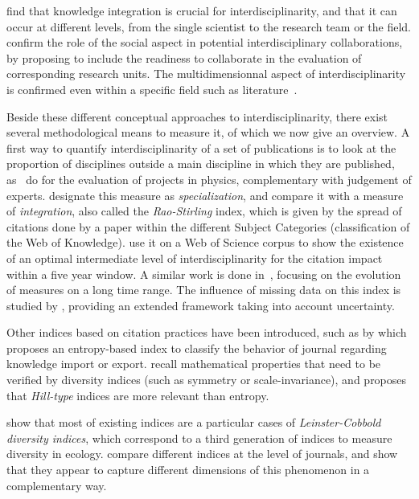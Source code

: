 \documentclass[10pt]{article}
\begin{document}
\cite{wagner2011approaches} find that knowledge integration is crucial for interdisciplinarity, and that it can occur at different levels, from the single scientist to the research team or the field. \cite{hall2008collaboration} confirm the role of the social aspect in potential interdisciplinary collaborations, by proposing to include the readiness to collaborate in the evaluation of corresponding research units. The multidimensionnal aspect of interdisciplinarity is confirmed even within a specific field such as literature~\citep{austin1996defining}.

Beside these different conceptual approaches to interdisciplinarity, there exist several methodological means to measure it, of which we now give an overview. A first way to quantify interdisciplinarity of a set of publications is to look at the proportion of disciplines outside a main discipline in which they are published, as~\cite{rinia2002impact} do for the evaluation of projects in physics, complementary with judgement of experts. \cite{porter2007measuring} designate this measure as \emph{specialization}, and compare it with a measure of \emph{integration}, also called the \emph{Rao-Stirling} index, which is given by the spread of citations done by a paper within the different Subject Categories (classification of the Web of Knowledge).\cite{lariviere2010relationship} use it on a Web of Science corpus to show the existence of an optimal intermediate level of interdisciplinarity for the citation impact within a five year window. A similar work is done in~\citep{lariviere201410}, focusing on the evolution of measures on a long time range. The influence of missing data on this index is studied by \cite{moreno2016uncertainty}, providing an extended framework taking into account uncertainty.

Other indices based on citation practices have been introduced, such as by \cite{rodriguez2017disciplinarity} which proposes an entropy-based index to classify the behavior of journal regarding knowledge import or export. \cite{zhang2016diversity} recall mathematical properties that need to be verified by diversity indices (such as symmetry or scale-invariance), and proposes that \emph{Hill-type} indices are more relevant than entropy.

\cite{mugabushaka2016bibliometric} show that most of existing indices are a particular cases of \emph{Leinster-Cobbold diversity indices}, which correspond to a third generation of indices to measure diversity in ecology. \cite{leydesdorff2011indicators} compare different indices at the level of journals, and show that they appear to capture different dimensions of this phenomenon in a complementary way.
\end{document}
